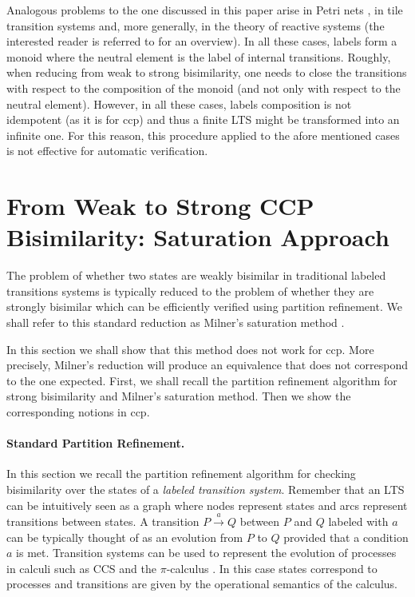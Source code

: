 \documentclass[copyright,creativecommons]{eptcs}
\newcommand{\rrarrow}{\longrightarrow}
\newcommand{\trans}[1]{\stackrel{#1}{\rrarrow}}
\newcommand{\tr}[1]{\trans{#1}}
\begin{document}
Analogous problems to the one discussed in this paper arise in Petri nets \cite{DBLP:conf/concur/Sobocinski10,DBLP:conf/concur/BruniMM11}, in tile transition systems \cite{DBLP:conf/birthday/GadducciM00,Bruni:05:CONCUR} and, more generally,
in the theory of reactive systems \cite{Jensen} (the interested reader is referred to \cite{Sobocinski12} for an overview).
In all these cases, labels form a monoid where the neutral element is the label of internal transitions.
Roughly, when reducing from weak to strong bisimilarity, one needs to close the transitions with respect to the composition of the monoid
(and not only with respect to the neutral element). However, in all these cases, labels composition is not idempotent
(as it is for ccp) and thus a finite LTS might be transformed into an infinite one. For this reason, this procedure applied
to the afore mentioned cases is not effective for automatic verification.




\section{From Weak to Strong CCP Bisimilarity: Saturation Approach } \label{sec:background}

The problem of whether two states are weakly bisimilar  in traditional labeled transitions systems
is typically reduced to the problem of whether  they are strongly bisimilar which can be
efficiently verified using partition refinement. We shall refer to this standard reduction as Milner's saturation method \cite{Aceto:11:BookChapter}.

In this section we shall show that this method does not work for ccp. More precisely,  Milner's reduction
will produce an equivalence that does not correspond to the one expected. First,
we shall recall the partition refinement algorithm for strong bisimilarity and Milner's saturation method. Then we show
the corresponding notions in ccp.






\paragraph{Standard Partition Refinement.} \label{sssec:partitionRef}
In this section we recall the partition refinement algorithm \cite{Kanellakis:83:PODC} for
checking bisimilarity over the states of a \emph{labeled transition system}.
Remember that an LTS can be intuitively seen as a graph where nodes represent states
and arcs represent transitions between states. A transition $P\tr{a}Q$ between $P$ and $Q$ labeled with $a$ can be
typically thought of as  an evolution from $P$ to $Q$ provided that a condition $a$ is met.
Transition systems can be used to represent the evolution of processes in calculi such
as CCS and the $\pi$-calculus \cite{Milner:80:Book,Milner:99:Book}.
In this case states correspond to processes and transitions are given by the operational semantics of the calculus.
\end{document}
